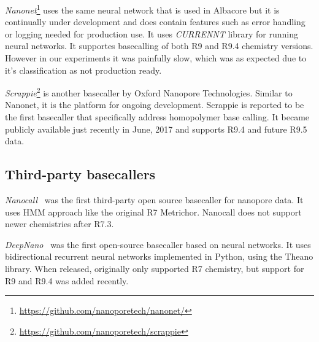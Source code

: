 \documentclass[runningheads,a4paper]{llncs}
\begin{document}
\textit{Nanonet}\footnote{\url{https://github.com/nanoporetech/nanonet/}} uses the same neural network that is used in Albacore but it is continually under development and does contain features such as error handling or logging needed for production use. It uses \textit{CURRENNT} library for running neural networks. It supportes basecalling of both R9 and R9.4 chemistry versions. However in our experiments it was painfully slow, which was as expected due to it's classification as not production ready.

\textit{Scrappie}\footnote{\url{https://github.com/nanoporetech/scrappie}} is another basecaller by Oxford Nanopore Technologies. Similar to Nanonet, it is the platform for ongoing development. Scrappie is reported to be the first basecaller  that specifically address homopolymer base calling. It became publicly available just recently in June, 2017 and supports R9.4 and future R9.5 data.

\subsection{Third-party basecallers}
\textit{Nanocall}~\cite{David046086} was the first third-party open source basecaller for nanopore data. It uses HMM approach like the original R7 Metrichor. Nanocall does not support newer chemistries after R7.3.

\textit{DeepNano}~\cite{Boza2017}  was the first open-source basecaller based on neural networks. It uses bidirectional recurrent neural networks implemented in Python, using the Theano library. When released, originally only supported R7 chemistry, but support for R9 and R9.4 was added recently.
\end{document}

